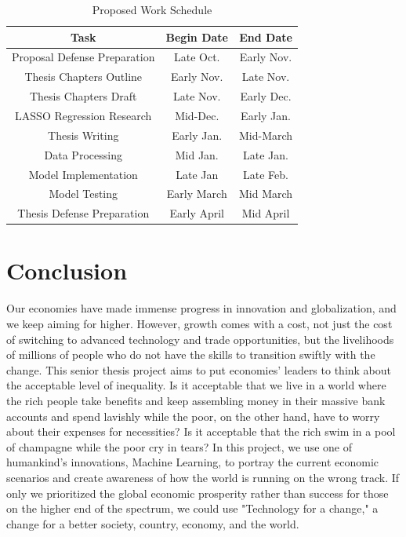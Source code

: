 \documentclass[12pt,oneside]{book} %
\begin{document}
\begin{table}[h!]
\centering
 \begin{tabular}{||c | c | c ||} 
 \hline
 \textbf{Task} & \textbf{Begin Date} & \textbf{End Date} \\ [0.5ex] 
 \hline\hline
 Proposal Defense Preparation & Late Oct. & Early Nov.\\ 
 \hline
 Thesis Chapters Outline & Early Nov. & Late Nov.\\
 \hline
 Thesis Chapters Draft & Late Nov. & Early Dec.\\
 \hline
 LASSO Regression Research & Mid-Dec. & Early Jan.\\
 \hline
 Thesis Writing & Early Jan. & Mid-March\\
 \hline
 Data Processing & Mid Jan. & Late Jan.\\
 \hline
 Model Implementation & Late Jan & Late Feb.\\
 \hline
 Model Testing & Early March & Mid March \\
 \hline
 Thesis Defense Preparation & Early April & Mid April\\ [1ex] 
 \hline
 \end{tabular}
 \caption{\label{tab:table1}Proposed Work Schedule}
\end{table}


\section{Conclusion}
\label{sec:conclusion}

\hspace{20pt}Our economies have made immense progress in innovation and globalization, and we keep aiming for higher. However, growth comes with a cost, not just the cost of switching to advanced technology and trade opportunities, but the livelihoods of millions of people who do not have the skills to transition swiftly with the change. This senior thesis project aims to put economies' leaders to think about the acceptable level of inequality. Is it acceptable that we live in a world where the rich people take benefits and keep assembling money in their massive bank accounts and spend lavishly while the poor, on the other hand, have to worry about their expenses for necessities? Is it acceptable that the rich swim in a pool of champagne while the poor cry in tears? In this project, we use one of humankind's innovations, Machine Learning, to portray the current economic scenarios and create awareness of how the world is running on the wrong track. If only we prioritized the global economic prosperity rather than success for those on the higher end of the spectrum, we could use "Technology for a change," a change for a better society, country, economy, and the world.
 
\end{document}
